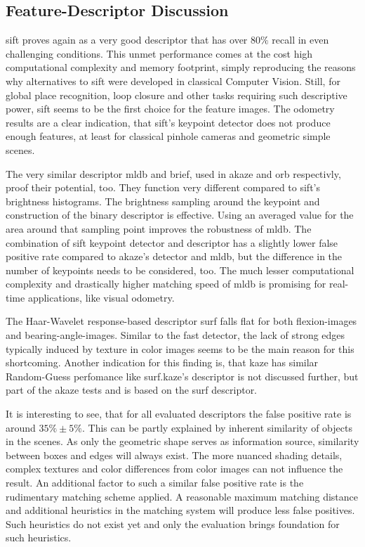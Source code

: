 \subsection{Feature-Descriptor Discussion}

\acrshort{sift} proves again as a very good descriptor that has over $80\%$ recall in even challenging conditions.
This unmet performance comes at the cost high computational complexity and memory footprint, simply reproducing the reasons why alternatives to \acrshort{sift} were developed in classical Computer Vision.
Still, for global place recognition, loop closure and other tasks requiring such descriptive power, \acrshort{sift} seems to be the first choice for the feature images.
The odometry results are a clear indication, that \acrshort{sift}'s keypoint detector does not produce enough features, at least for classical pinhole cameras and geometric simple scenes.

The very similar descriptor \acrshort{mldb} and \acrshort{brief}, used in \acrshort{akaze} and \acrshort{orb} respectivly, proof their potential, too.
They function very different compared to \acrshort{sift}'s brightness histograms.
The brightness sampling around the keypoint and construction of the binary descriptor is effective.
Using an averaged value for the area around that sampling point improves the robustness of \acrshort{mldb}.
The combination of \acrshort{sift} keypoint detector and descriptor has a slightly lower false positive rate compared to \acrshort{akaze}'s detector and \acrshort{mldb}, but the difference in the number of keypoints needs to be considered, too.
The much lesser computational complexity and drastically higher matching speed of \acrshort{mldb} is promising for real-time applications, like visual odometry.

The Haar-Wavelet response-based descriptor \acrshort{surf} falls flat for both \glspl{flexion-image} and \glspl{bearing-angle-image}.
Similar to the \acrshort{fast} detector, the lack of strong edges typically induced by texture in color images seems to be the main reason for this shortcoming.
Another indication for this finding is, that \acrshort{kaze} has similar Random-Guess perfomance like \acrshort{surf}.\acrshort{kaze}'s descriptor is not discussed further, but part of the \acrshort{akaze} tests and is based on the \acrshort{surf} descriptor.

It is interesting to see, that for all evaluated descriptors the false positive rate is around $35\% \pm 5\%$.
This can be partly explained by inherent similarity of objects in the scenes.
As only the geometric shape serves as information source, similarity between boxes and edges will always exist.
The more nuanced shading details, complex textures and color differences from color images can not influence the result.
An additional factor to such a similar false positive rate is the rudimentary matching scheme applied.
A reasonable maximum matching distance and additional heuristics in the matching system will produce less false positives.
Such heuristics do not exist yet and only the evaluation brings foundation for such heuristics.
